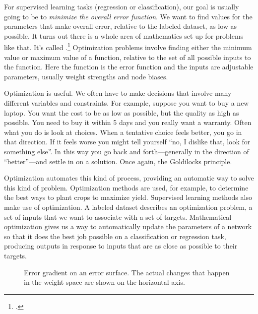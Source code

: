 For supervised learning tasks (regression or classification), our goal is usually going to be to \emph{minimize the overall error function}. We want to find values for the parameters that make overall error, relative to the labeled dataset, as low as possible. It turns out there is a whole area of mathematics set up for problems like that. It's called .\footnote{.} Optimization problems involve finding either the minimum value or maximum value of a function, relative to the set of all possible inputs to the function. Here the function is the error function and the inputs are adjustable parameters, usually weight strengths and node biases.

Optimization is useful. We often have to make decisions that involve many different variables and constraints. For example, suppose you want to buy a new laptop. You want the cost to be as low as possible, but the quality as high as possible. You need to buy it within 5 days and you really want a warranty. Often what you do is look at choices. When a tentative choice feels  better, you go in that direction. If it feels worse  you might tell yourself  ``no, I dislike that, look for something else''. In this way you go back and forth---generally in the direction of ``better''---and settle in on a solution. Once again, the Goldilocks principle.

Optimization automates this kind of process, providing an automatic way to solve this kind of problem. Optimization methods are used, for example, to determine the best ways to plant crops to maximize yield. Supervised learning methods also make use of optimization. A labeled dataset describes an optimization problem, a set of inputs that we want to associate with a set of targets. Mathematical optimization gives us a way to automatically update the parameters of a network so that it does the best job possible on a classification or regression task, producing outputs in response to inputs that are as close as possible to their targets.

\begin{figure}[h]
\centering
{}
\caption[Jeff Yoshimi.]{Error gradient on an error surface. The actual changes that happen in the weight space are shown on the horizontal axis.}
\label{gradient_descent}
\end{figure}

